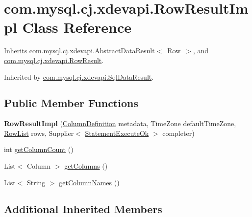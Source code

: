 \hypertarget{classcom_1_1mysql_1_1cj_1_1xdevapi_1_1_row_result_impl}{}\section{com.\+mysql.\+cj.\+xdevapi.\+Row\+Result\+Impl Class Reference}
\label{classcom_1_1mysql_1_1cj_1_1xdevapi_1_1_row_result_impl}


Inherits \mbox{\hyperlink{classcom_1_1mysql_1_1cj_1_1xdevapi_1_1_abstract_data_result}{com.\+mysql.\+cj.\+xdevapi.\+Abstract\+Data\+Result$<$ Row $>$}}, and \mbox{\hyperlink{interfacecom_1_1mysql_1_1cj_1_1xdevapi_1_1_row_result}{com.\+mysql.\+cj.\+xdevapi.\+Row\+Result}}.



Inherited by \mbox{\hyperlink{classcom_1_1mysql_1_1cj_1_1xdevapi_1_1_sql_data_result}{com.\+mysql.\+cj.\+xdevapi.\+Sql\+Data\+Result}}.

\subsection*{Public Member Functions}
\begin{DoxyCompactItemize}
\item 
\mbox{\label{classcom_1_1mysql_1_1cj_1_1xdevapi_1_1_row_result_impl_aa72492fb1dea056a707df03ddd2d45d8}} 
{\bfseries Row\+Result\+Impl} (\mbox{\hyperlink{interfacecom_1_1mysql_1_1cj_1_1protocol_1_1_column_definition}{Column\+Definition}} metadata, Time\+Zone default\+Time\+Zone, \mbox{\hyperlink{interfacecom_1_1mysql_1_1cj_1_1result_1_1_row_list}{Row\+List}} rows, Supplier$<$ \mbox{\hyperlink{classcom_1_1mysql_1_1cj_1_1protocol_1_1x_1_1_statement_execute_ok}{Statement\+Execute\+Ok}} $>$ completer)
\item 
int \mbox{\hyperlink{classcom_1_1mysql_1_1cj_1_1xdevapi_1_1_row_result_impl_a0daf18aecc605cbeadee206dc119906f}{get\+Column\+Count}} ()
\item 
List$<$ Column $>$ \mbox{\hyperlink{classcom_1_1mysql_1_1cj_1_1xdevapi_1_1_row_result_impl_a080528edc647e5ab131333d69042b167}{get\+Columns}} ()
\item 
List$<$ String $>$ \mbox{\hyperlink{classcom_1_1mysql_1_1cj_1_1xdevapi_1_1_row_result_impl_a64fc6e525116d24a678c4538f4f072ae}{get\+Column\+Names}} ()
\end{DoxyCompactItemize}
\subsection*{Additional Inherited Members}


